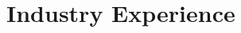 \documentclass[11pt]{article}
\begin{document}


\section*{Industry Experience}
\vspace{-1em}
\end{document}
